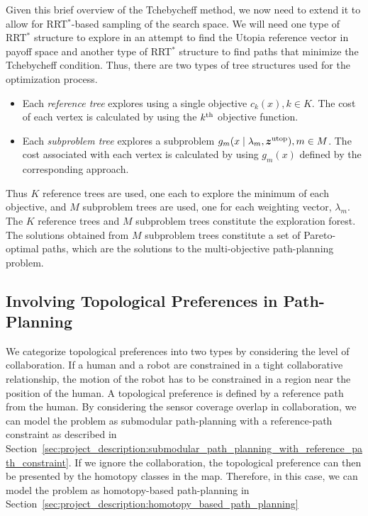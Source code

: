 \documentclass[phd]{byuprop}
\begin{document}
Given this brief overview of the Tchebycheff method, we now need to extend it to allow for RRT$^{*}$-based sampling of the search space.  
We will need one type of RRT$^{*}$ structure to explore in an attempt to find the Utopia reference vector in payoff space and another type of RRT$^{*}$ structure to find paths that minimize the Tchebycheff condition. %
Thus, there are two types of tree structures used for the optimization process.
\begin{itemize}
	\item Each \emph{reference tree} explores using a single objective $ c_{k} (x), k \in K $. 
	The cost of each vertex is calculated by using the $ k^{\rm th} $ objective function.
	\item Each \emph{subproblem tree} explores a subproblem $ g_{m} ( x \mid \lambda_{m} , \bm{z}^{\rm utop} ) , m \in M $.
	The cost associated with each vertex is calculated by using $ g_{m}(x) $ defined by the corresponding approach.
\end{itemize}
Thus $ K $ reference trees are used, one each to explore the minimum of each objective, and $ M $ subproblem trees are used, one for each weighting vector, $ \lambda_{m} $.  
The $K$ reference trees and $M$ subproblem trees constitute the exploration forest.
The solutions obtained from $ M $ subproblem trees constitute a set of Pareto-optimal paths, which are the solutions to the multi-objective path-planning problem. 

\subsection{Involving Topological Preferences in Path-Planning}
\label{sec:project_description:involving_topological_preferences_in_path_planning}

We categorize topological preferences into two types by considering the level of collaboration.
If a human and a robot are constrained in a tight collaborative relationship, the motion of the robot has to be constrained in a region near the position of the human.
A topological preference is defined by a reference path from the human.
By considering the sensor coverage overlap in collaboration, we can model the problem as submodular path-planning with a reference-path constraint as described in Section~\ref{sec:project_description:submodular_path_planning_with_reference_path_constraint}.
If we ignore the collaboration, the topological preference can then be presented by the homotopy classes in the map.
Therefore, in this case, we can model the problem as homotopy-based path-planning in Section~\ref{sec:project_description:homotopy_based_path_planning} 
\end{document}

